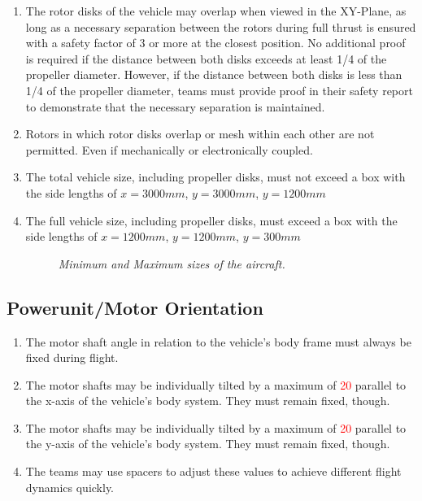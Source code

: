 \documentclass{article}
\begin{document}
\begin{enumerate}
  \item The rotor disks of the vehicle may overlap when viewed in the XY-Plane, as long as a necessary separation between the rotors during full thrust is ensured with a safety factor of 3 or more at the closest position. No additional proof is required if the distance between both disks exceeds at least 1/4 of the propeller diameter. However, if the distance between both disks is less than 1/4 of the propeller diameter, teams must provide proof in their safety report to demonstrate that the necessary separation is maintained.  \item Rotors in which rotor disks overlap or mesh within each other are not permitted. Even if mechanically or electronically coupled.
  \item The total vehicle size, including propeller disks, must not exceed a box with the side lengths of $x=3000mm$, $y=3000mm$, $y=1200mm$
  \item The full vehicle size, including propeller disks, must exceed a box with the side lengths of $x=1200mm$, $y=1200mm$, $y=300mm$

  \begin{figure}[h!]
    \centering
    \caption{\textit{Minimum and Maximum sizes of the aircraft.}}
  \end{figure}
    
\end{enumerate}

\subsection{Powerunit/Motor Orientation}
\begin{enumerate}
  \item The motor shaft angle in relation to the vehicle's body frame must always be fixed during flight. 
  \item The motor shafts may be individually tilted by a maximum of \textcolor{red}{20\degree} parallel to the x-axis of the vehicle's body system. They must remain fixed, though.
  \item The motor shafts may be individually tilted by a maximum of \textcolor{red}{20\degree}  parallel to the y-axis of the vehicle's body system. They must remain fixed, though.
  \item The teams may use spacers to adjust these values to achieve different flight dynamics quickly.
\end{enumerate}
\end{document}
